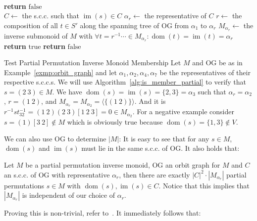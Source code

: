 \begin{algorithm}
  \caption{Test partial permutation inverse monoid membership.}
  \label{alg:is_member_partial}
  \begin{algorithmic}[1]
      \\
        \State \textbf{return} $\mathrm{false}$
      \EndIf
      \\
      \State $C \gets$ the s.c.c. such that $\operatorname{im}(s) \in C$
      \State $\alpha_r \gets$ the representative of $C$
      \State $r \gets$ the composition of all $t \in S'$ along the spanning tree
              of $\mathrm{OG}$ from $\alpha_1$ to $\alpha_r$
      \State $M_{\alpha_r} \gets$ the inverse submonoid of $M$ with $\forall t
              = r^{-1} \cdots \in M_{\alpha_r}: \operatorname{dom}(t) =
              \operatorname{im}(t) = \alpha_r$
      \\
          \State \textbf{return} $\mathrm{true}$
      \Else
          \State \textbf{return} $\mathrm{false}$
      \EndIf
    \EndProcedure
  \end{algorithmic}
\end{algorithm}

\begin{exmp}{Test Partial Permutation Inverse Monoid Membership}
  Let $M$ and $\mathrm{OG}$ be as in Example~\ref{exmp:orbit_graph} and let
  $\alpha_1, \alpha_2, \alpha_4, \alpha_7$ be the representatives of their
  respective s.c.c.s. We will use Algorithm~\ref{alg:is_member_partial} to verify
  that $s = (2\ 3) \in M$. We have $\operatorname{dom}(s) = \operatorname{im}(s)
  = \{2,3\} = \alpha_3$ such that $\alpha_r = \alpha_2$, $r = (1\ 2)$, and
  $M_{\alpha_r} = M_{\alpha_2} = \langle\{(1\ 2)\}\rangle$.  And it is $r^{-1} s
  t_{32}^{-1} = (1\ 2) (2\ 3) [1\ 2\ 3] = 0 \in M_{\alpha_2}$.
  For a negative example consider $s = (1)[3\ 2] \notin M$ which is obviously
  true because $\operatorname{dom}(s) = \{1,3\} \notin V$.
\end{exmp}
%
We can also use $\mathrm{OG}$ to determine $|M|$: It is easy to see that for
any $s \in M$, $\operatorname{dom}(s)$ and $\operatorname{im}(s)$ must lie in
the same s.c.c. of $\mathrm{OG}$. It also holds that:

\begin{lemma}[label=lemma:partial_permutation_inverse_monoid_order]{}
  Let $M$ be a partial permutation inverse monoid, $\mathrm{OG}$ an orbit graph
  for $M$ and $C$ an s.c.c. of $\mathrm{OG}$ with representative $\alpha_r$, then
  there are exactly $|C|^2 \cdot |M_{\alpha_r}|$ partial permutations $s \in M$
  with $\operatorname{dom}(s), \operatorname{im}(s) \in C$. Notice that this
  implies that $|M_{\alpha_r}|$ is independent of our choice of $\alpha_r$.
\end{lemma}
%
Proving this is non-trivial, refer to~\cite{Mitchell}. It immediately follows
that:

